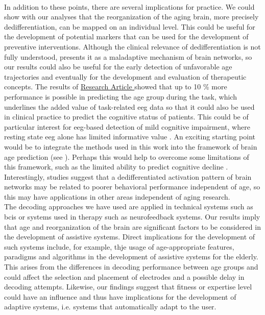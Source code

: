 \\
In addition to these points, there are several implications for practice. We could show with our analyses that the reorganization of the aging brain, more precisely dedifferentiation, can be mapped on an individual level. This could be useful for the development of potential markers that can be used for the development of preventive interventions. 
Although the clinical relevance of dedifferentiation is not fully understood, \citeauthor{Fornito2015} \cite{Fornito2015} presents it as a maladaptive mechanism of brain networks, so our results could also be useful for the early detection of unfavorable age trajectories and eventually for the development and evaluation of therapeutic concepts. The results of \hyperref[results:paperII]{Research Article } showed that up to 10 \% more performance is possible in predicting the age group during the task, which underlines the added value of task-related \gls{eeg} data so that it could also be used in clinical practice to predict the cognitive status of patients. This could be of particular interest for \gls{eeg}-based detection of mild cognitive impairment, where resting state \gls{eeg} alone has limited informative value \cite{Froehlich2021, Farina2020}. An exciting starting point would be to integrate the methods used in this work into the framework of brain age prediction (see ). Perhaps this would help to overcome some limitations of this framework, such as the limited ability to predict cognitive decline \cite{Tetereva2023}. Interestingly, studies suggest that a dedifferentiated activation pattern of brain networks may be related to poorer behavioral performance independent of age, so this may have applications in other areas independent of aging research.\\
The decoding approaches we have used are applied in technical systems such as \glspl{bci} or systems used in therapy such as neurofeedback systems. Our results imply that age and reorganization of the brain are significant factors to be considered in the development of assistive systems.  Direct implications for the development of such systems include, for example, thje usage of age-appropriate features, paradigms and algorithms in the development of assistive systems for the elderly. This arises from the differences in decoding performance between age groups and could affect the selection and placement of electrodes and a possible delay in decoding attempts. Likewise, our findings suggest that fitness or expertise level could have an influence and thus have implications for the development of adaptive systems, i.e. systems that automatically adapt to the user. 

